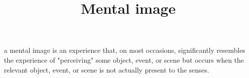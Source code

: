 \documentclass[a4paper]{article}
\title{Mental image}
\date{}
\begin{document}
    \maketitle
    a mental image is an experience that, on most occasions, significantly resembles the experience of "perceiving" some object, event, or scene but occurs when the relevant object, event, or scene is not actually present to the senses. 
\end{document}
